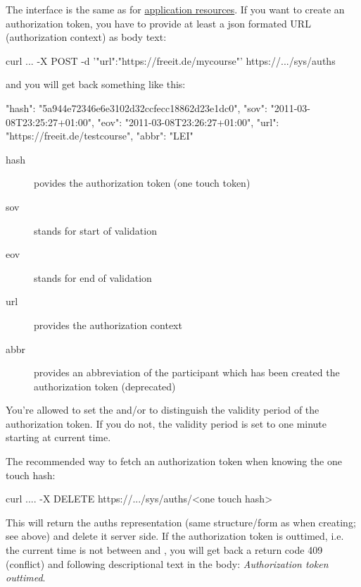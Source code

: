 The interface is the same as for
\href{https://ecs.uni-stuttgart.de/ecsa-wiki/HeikoBernloehr/FreeLancer/ECS/ecs2/core#application\_resources}{application
resources}. If you want to create an authorization token, you have to provide
at least a json formated URL (authorization context) as body text:
\begin{code}
curl ... -X POST -d '{"url":"https://freeit.de/mycourse"}' https://.../sys/auths
\end{code}
and you will get back something like this:
\begin{code}
{
  "hash": "5a944e72346e6e3102d32ccfecc18862d23e1dc0",
  "sov": "2011-03-08T23:25:27+01:00",
  "eov": "2011-03-08T23:26:27+01:00",
  "url": "https://freeit.de/testcourse",
  "abbr": "LEI"
}
\end{code}
\begin{description}
  \item[hash] povides the authorization token (one touch token) 
  \item[sov] stands for start of validation 
  \item[eov] stands for end of validation 
  \item[url] provides the authorization context 
  \item[abbr] provides an abbreviation of the participant which has been
  created the authorization token (deprecated) 
\end{description}
You're allowed to set the  and/or  to distinguish the validity
period of the authorization token. If you do not, the validity period is set to
one minute starting at current time.

The recommended way to fetch an authorization token when knowing the one touch hash:
\begin{code}
curl .... -X DELETE https://.../sys/auths/<one touch hash>
\end{code}
This will return the auths representation (same structure/form as when
creating; see above) and delete it server side. If the authorization token is
outtimed, i.e. the current time is not between  and , you will
get back a return code 409 (conflict) and following descriptional text in the
body: \textit{Authorization token outtimed}.
